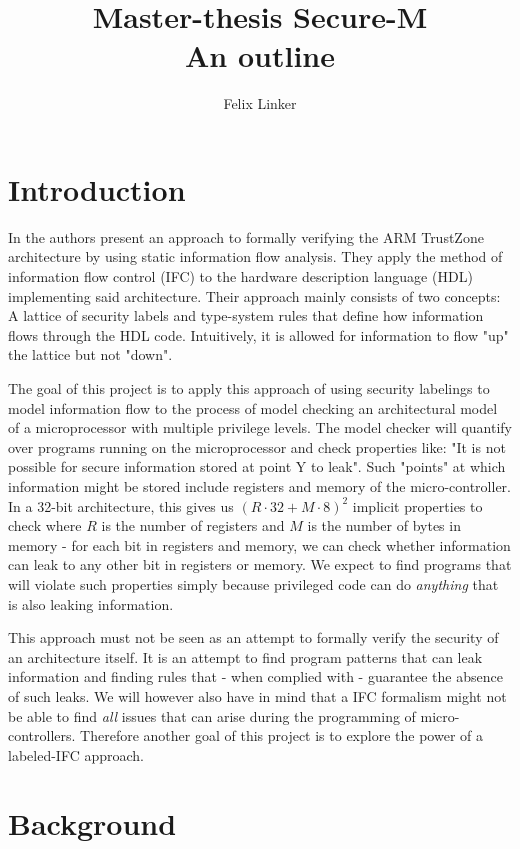 \documentclass{securem}
\title{Master-thesis Secure-M \\ \large{An outline}}
\author{Felix Linker}
\date{}
\begin{document}
\maketitle

\section{Introduction}

In \cite{Ferraiuolo17} the authors present an approach to formally verifying the ARM TrustZone architecture by using static information flow analysis.
They apply the method of information flow control (IFC) to the hardware description language (HDL) implementing said architecture.
Their approach mainly consists of two concepts: A lattice of security labels and type-system rules that define how information flows through the HDL code.
Intuitively, it is allowed for information to flow "up" the lattice but not "down".

The goal of this project is to apply this approach of using security labelings to model information flow to the process of model checking an architectural model of a microprocessor with multiple privilege levels.
The model checker will quantify over programs running on the microprocessor and check properties like: "It is not possible for secure information stored at point Y to leak".
Such "points" at which information might be stored include registers and memory of the micro-controller.
In a 32-bit architecture, this gives us $ (R \cdot 32 + M \cdot 8)^2 $ implicit properties to check where $ R $ is the number of registers and $ M $ is the number of bytes in memory - for each bit in registers and memory, we can check whether information can leak to any other bit in registers or memory.
We expect to find programs that will violate such properties simply because privileged code can do \textit{anything} that is also leaking information.

This approach must not be seen as an attempt to formally verify the security of an architecture itself.
It is an attempt to find program patterns that can leak information and finding rules that - when complied with - guarantee the absence of such leaks.
We will however also have in mind that a IFC formalism might not be able to find \textit{all} issues that can arise during the programming of micro-controllers.
Therefore another goal of this project is to explore the power of a labeled-IFC approach.

\section{Background}
\end{document}
